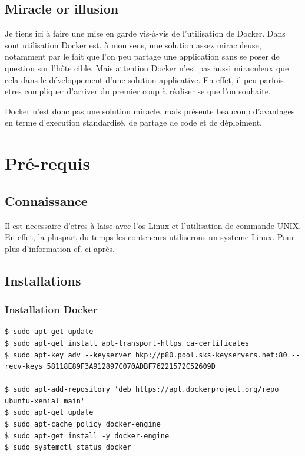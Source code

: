 \subsection{Miracle or illusion}
Je tiens ici à faire une mise en garde vis-à-vis de l'utilisation de Docker. Dans sont utilisation Docker est, à mon sens, une solution assez miraculeuse, notamment par le fait que l'on peu partage une application sans se poser de question sur l'hôte cible. Mais attention Docker n'est pas aussi miraculeux que cela dans le développement d'une solution applicative. En effet, il peu parfois etres compliquer d'arriver du premier coup à réaliser se que l'on souhaite.

Docker n'est donc pas une solution miracle, mais présente beaucoup d'avantages en terme d'execution standardisé, de partage de code et de déploiment.

\section{Pré-requis}
\subsection{Connaissance}
Il est necessaire d'etres à laise avec l'\gls{os} Linux et l'utilisation de commande UNIX. En effet, la pluspart du temps les conteneurs utiliserons un systeme Linux. Pour plus d'information cf. ci-après.


\subsection{Installations}
\lstset{language=bash}

\subsubsection{Installation Docker}
\begin{lstlisting}[frame=single]
$ sudo apt-get update
$ sudo apt-get install apt-transport-https ca-certificates
$ sudo apt-key adv --keyserver hkp://p80.pool.sks-keyservers.net:80 --recv-keys 58118E89F3A912897C070ADBF76221572C52609D

$ sudo apt-add-repository 'deb https://apt.dockerproject.org/repo ubuntu-xenial main'
$ sudo apt-get update
$ sudo apt-cache policy docker-engine
$ sudo apt-get install -y docker-engine
$ sudo systemctl status docker
\end{lstlisting}

